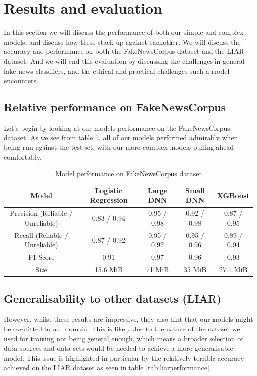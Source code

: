 \section{Results and evaluation}
In this section we will discuss the performance of both our simple and complex models, and discuss how these stack up
against eachother. We will discuss the accuracy and performance on both the FakeNewsCorpus dataset and the LIAR
dataset. And we will end this evaluation by discussing the challenges in general fake news classifiers, and the
ethical and practical challenges such a model encounters.

\subsection{Relative performance on FakeNewsCorpus}
Let's begin by looking at our models performance on the FakeNewsCorpus dataset. As we see from table \ref{tab:fakenewsperformance},
all of our models performed admirably when being run against the test set, with our more complex models pulling ahead
comfortably.

\begin{table}[htpb]
  \centering
  \caption{Model performance on FakeNewsCorpus dataset}
  \label{tab:fakenewsperformance}

  \begin{tabular}{c|cccc}
    Model & Logistic Regression & Large DNN & Small DNN & XGBoost \\ \hline
    Precision (Reliable / Unreliable) & 0.83 / 0.94 & 0.95 / 0.98 & 0.92 / 0.98 & 0.87 / 0.95 \\ \hline
    Recall (Reliable / Unreliable) & 0.87 / 0.92 & 0.95 / 0.92 & 0.95 / 0.96 & 0.89 / 0.94 \\ \hline
    F1-Score & 0.91 & 0.97 & 0.96 & 0.93 \\ \hline
    Size & 15.6 MiB & 71 MiB & 35 MiB & 27.1 MiB 
  \end{tabular}
\end{table}

\subsection{Generalisability to other datasets (LIAR)}
However, whilst these results are impressive, they also hint that our models might be overfitted to our domain. This is
likely due to the nature of the dataset we used for training not being general enough, which means a broader selection
of data sources and data sets would be needed to achieve a more generalisable model. This issue is highlighted in
particular by the relatively terrible accuracy achieved on the LIAR dataset as seen in table \ref{tab:liarperformance}.


